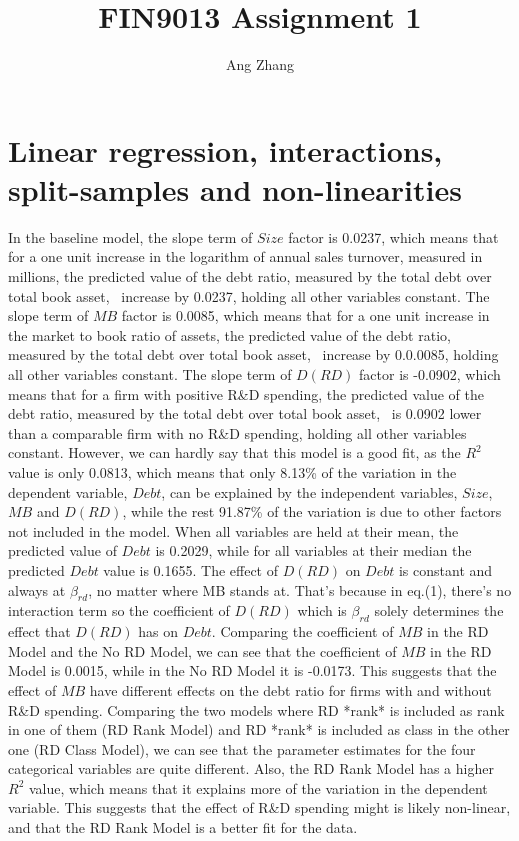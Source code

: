 \documentclass[12pt, times]{article}
\title{FIN9013 Assignment 1}
\author{Ang Zhang}
\begin{document}
\maketitle

\onehalfspacing


\section*{Linear regression, interactions, split-samples and non-linearities}

In the baseline model, the slope term of $Size$ factor is 0.0237, 
which means that for a one unit increase in the logarithm of annual sales turnover, 
measured in millions, the predicted value of the debt ratio, measured by the total debt over total book asset, \
increase by 0.0237, holding all other variables constant.
The slope term of $MB$ factor is 0.0085, which means that for a one unit increase in the market to book ratio of assets, 
the predicted value of the debt ratio, measured by the total debt over total book asset, \
increase by 0.0.0085, holding all other variables constant.
The slope term of $D(RD)$ factor is -0.0902, which means that for a firm with positive R\&D spending, 
the predicted value of the debt ratio, measured by the total debt over total book asset, \
is 0.0902 lower than a comparable firm with no R\&D spending, holding all other variables constant.
\newline
However, we can hardly say that this model is a good fit, as the $R^2$ value is only 0.0813, which means that only 8.13\% of the
variation in the dependent variable, $Debt$, can be explained by the independent variables, $Size$, $MB$ and $D(RD)$,
while the rest 91.87\% of the variation is due to other factors not included in the model.
\newline
When all variables are held at their mean, the predicted value of $Debt$ is 0.2029, while for all variables at their 
median the predicted $Debt$ value is 0.1655.
\newline
The effect of $D(RD)$ on $Debt$ is constant and always at $\beta_{rd}$, no matter where MB stands at.
That's because in eq.(1), there's no interaction term so the coefficient of $D(RD)$ which is $\beta_{rd}$ solely determines the effect
that $D(RD)$ has on $Debt$.
\newline
Comparing the coefficient of $MB$ in the RD Model and the No RD Model, 
we can see that the coefficient of $MB$ in the RD Model is 0.0015, while 
in the No RD Model it is -0.0173. This suggests that the effect of $MB$ have different
effects on the debt ratio for firms with and without R\&D spending. 
\newline
Comparing the two models where RD *rank* is included as rank in one of them (RD Rank Model)
and RD *rank* is included as class in the other one (RD Class Model), we can see that the parameter
estimates for the four categorical variables are quite different. Also, the
 RD Rank Model has a higher $R^2$ value, which means that it explains more of the 
 variation in the dependent variable. This suggests that the effect of R\&D spending
 might is likely non-linear, and that the RD Rank Model is a better fit for the data.
\end{document}
